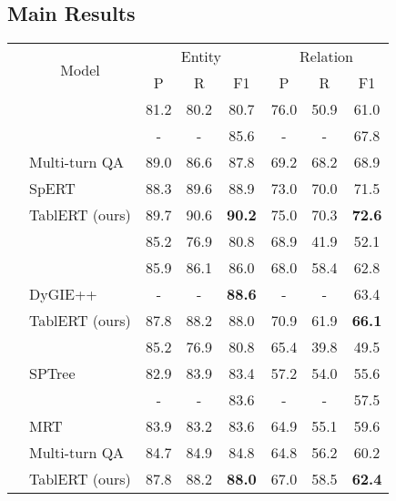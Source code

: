 \documentclass[11pt,a4paper]{article}
\begin{document}
\subsection{Main Results}
\label{results}


\begin{table*}[t]
    \centering
    \begin{tabular}{llcccccc}
    \Xhline{3\arrayrulewidth}
         \multicolumn{1}{c}{\multirow{2}{*}{Dataset}}& \multicolumn{1}{c}{\multirow{2}{*}{Model}}  & \multicolumn{3}{c}{Entity} & \multicolumn{3}{c}{Relation}\\
        \cline{3-8}
        & & P & R & F1 & P & R & F1 \\
        \Xhline{2\arrayrulewidth}
        \multirow{5}{*}{CoNLL04} & \citet{miwa-sasaki-2014-modeling} & 81.2 & 80.2 & 80.7 & 76.0 & 50.9 & 61.0 \\
        & \citet{zhang-etal-2017-end}& - & - & 85.6 & - & - & 67.8 \\
        & Multi-turn QA~\cite{li-etal-2019-entity}& 89.0 & 86.6 & 87.8 & 69.2 &  68.2 & 68.9 \\
        & SpERT~\cite{spert}& 88.3 & 89.6 & 88.9 & 73.0& 70.0& 71.5 \\
        \cline{2-8}
        & TablERT (ours) & 89.7 & 90.6 & \textbf{90.2} & 75.0 & 70.3 & \textbf{72.6} \\
        \Xhline{2\arrayrulewidth}
        \multirow{4}{*}{} & \citet{li-ji-2014-incremental} &85.2 & 76.9 & 80.8 & 68.9 & 41.9 & 52.1\\
        &  \citet{dixit-al-onaizan-2019-span}& 85.9 & 86.1 & 86.0 & 68.0 & 58.4 & 62.8 \\
        & DyGIE++~\cite{Wadden2019EntityRA} & - & - & \textbf{88.6} & - & - & 63.4  \\
        \cline{2-8}
        & TablERT (ours) & 87.8 & 88.2 & 88.0 & 70.9 & 61.9 & \textbf{66.1} \\
        \Xhline{2\arrayrulewidth}
        \multirow{5}{*}{} & \citet{li-ji-2014-incremental} &85.2 & 76.9 & 80.8 & 65.4 & 39.8& 49.5\\
        & SPTree~\cite{miwa-bansal-2016-end}& 82.9 & 83.9 & 83.4 & 57.2 & 54.0 & 55.6 \\
        & \citet{zhang-etal-2017-end} & - & - & 83.6 & - & - & 57.5\\
        & MRT~\cite{sun-etal-2018-extracting}& 83.9 & 83.2 & 83.6& 64.9 & 55.1 & 59.6\\
        & Multi-turn QA~\cite{li-etal-2019-entity} & 84.7 & 84.9 & 84.8 & 64.8 & 56.2 & 60.2 \\
        \cline{2-8}
        & TablERT (ours) & 87.8 & 88.2 & \textbf{88.0} & 67.0 & 58.5 & \textbf{62.4}\\
        

\end{tabular}
\end{table*}
\end{document}
